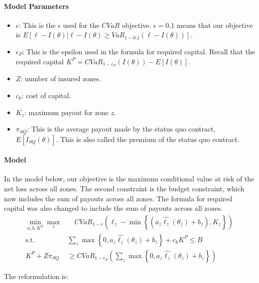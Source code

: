 \documentclass[11pt]{article}
\begin{document}
    \paragraph*{Model Parameters}
    \begin{itemize}
        \item $\epsilon$: This is the $\epsilon$ used for the $CVaR$ objective.  $\epsilon = 0.1$ means that our objective is $E[\ell - I(\theta)|\ell -I(\theta) \geq VaR_{1-0.1}\left ( \ell - I(\theta) \right )]$.  
        \item $\epsilon_P$: This is the epsilon used in the formula for required capital. Recall that the required capital $K^P = CVaR_{1-\epsilon_P}(I(\theta)) - E[I(\theta)]$. 
        \item $Z$: number of insured zones.
        \item $c_k$: cost of capital. 
        \item $K_z$: maximum payout for zone $z$.
        \item $\pi_{SQ}$: This is the average payout made by the status quo contract, $E[I_{SQ}(\theta)]$. This is also called the premium of the status quo contract.   
    \end{itemize}

    \paragraph*{Model}
    In the model below, our objective is the maximum conditional value at risk of the net loss across all zones. The second constraint is the budget constraint, which now includes the sum of payouts across all zones. The formula for required capital was also changed to include the sum of payouts across all zones. 
    \begin{align}
      \min_{a,b,K^P} \max_z &\quad CVaR_{1-\epsilon}(\ell_z - \min \left \{ (a_z\hat{\ell_z}(\theta_z) + b_z), K_z \right \})\\
      \text{s.t.   } & \sum_z \max \left \{ 0, a_z\hat{\ell_z}(\theta_z) + b_z \right \} + c_k K^P \leq B\\
      K^P + Z\pi_{SQ} &\geq CVaR_{1-\epsilon_P} \left( \sum_z \max \left \{ 0,a_z\hat{\ell_z}(\theta_z) + b_z \right \} \right )
    \end{align}

    The reformulation is: 
\end{document}
